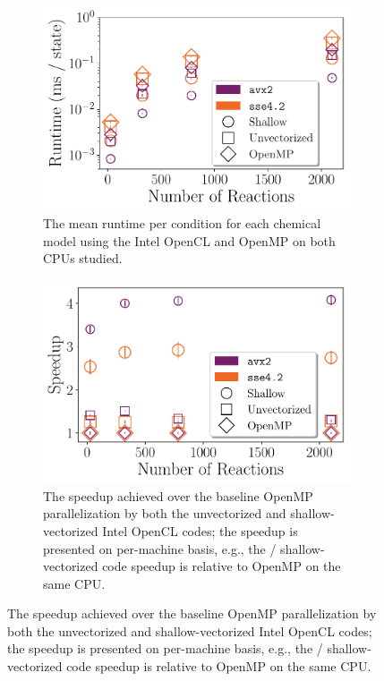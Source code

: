 \documentclass[12pt,number,sort&compress,preprint]{elsarticle}
\begin{document}
\begin{figure}[htbp!]
   \centering
  \begin{subfigure}[t]{0.48\linewidth}
      \includegraphics[width=\textwidth]{intel_source_nonorm.pdf}
      \caption{The mean runtime per condition for each chemical model using the Intel OpenCL and OpenMP on both CPUs studied.}
      \label{F:intel_source_noorm}
  \end{subfigure}
  \hfill
  \begin{subfigure}[t]{0.48\linewidth}
      \includegraphics[width=\textwidth]{intel_source.pdf}
      \caption{The speedup achieved over the baseline OpenMP parallelization by both the unvectorized and shallow-vectorized Intel OpenCL codes; the speedup is presented on per-machine basis, e.g., the / shallow-vectorized code speedup is relative to OpenMP on the same CPU.}
      \label{F:intel_source}
  \end{subfigure}

\end{figure}
\end{document}
